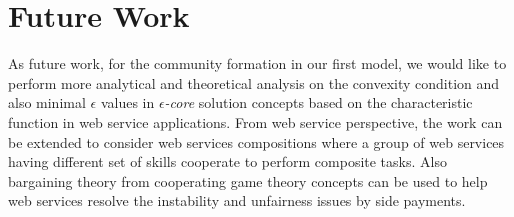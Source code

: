 



\section{Future Work}

As future work, for the community formation in our first model, we would like to perform more analytical and theoretical analysis on the convexity condition and also minimal
$\epsilon$ values in \emph{$\epsilon$-core} solution concepts based on the characteristic function in web service applications. From web service perspective, the work can be extended to consider web services compositions where a group of web services having different set of skills cooperate to perform composite tasks. Also bargaining theory from cooperating game theory concepts can be used to help web services resolve the instability and unfairness issues by side payments.

